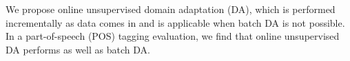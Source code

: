 We propose online unsupervised domain adaptation (DA), which is performed incrementally as data comes in and is applicable when batch DA is not possible. In a part-of-speech (POS) tagging evaluation, we find that online unsupervised DA performs as well as batch DA.
